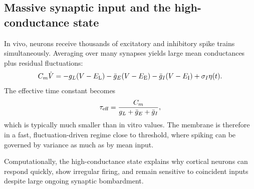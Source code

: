\subsection{Massive synaptic input and the high-conductance state}

In vivo, neurons receive thousands of excitatory and inhibitory spike trains simultaneously. Averaging over many synapses yields large mean conductances plus residual fluctuations:
%
\begin{equation}
  C_m\dot V = -g_L(V-E_{\mathrm{L}})-\bar g_E(V-E_{\mathrm{E}})-\bar g_I(V-E_{\mathrm{I}})+\sigma_I\eta(t).
  \label{eq:high-conductance}
\end{equation}
%
The effective time constant becomes
%
\begin{equation}
  \tau_{\text{eff}}=\frac{C_m}{g_L+\bar g_E+\bar g_I},
  \label{eq:tau-eff}
\end{equation}
%
which is typically much smaller than in vitro values. The membrane is therefore in a fast, fluctuation-driven regime close to threshold, where spiking can be governed by variance as much as by mean input.

Computationally, the high-conductance state explains why cortical neurons can respond quickly, show irregular firing, and remain sensitive to coincident inputs despite large ongoing synaptic bombardment.


